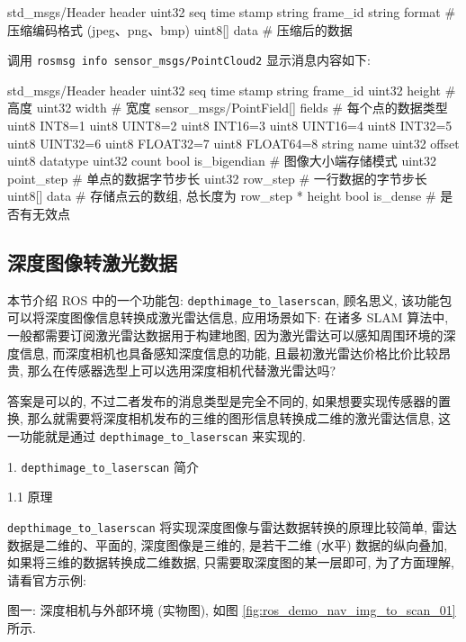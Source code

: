 \documentclass[openany, fontset=windowsold]{ctexbook}
\theoremstyle{kaiti}
\theoremstyle{normal}
\begin{document}
\begin{bash}
  std_msgs/Header header
    uint32 seq
    time stamp
    string frame_id
  string format # 压缩编码格式 (jpeg、png、bmp)
  uint8[] data # 压缩后的数据
\end{bash}

调用 \verb|rosmsg info sensor_msgs/PointCloud2| 显示消息内容如下:

\begin{bash}
  std_msgs/Header header
    uint32 seq
    time stamp
    string frame_id
  uint32 height # 高度
  uint32 width  # 宽度
  sensor_msgs/PointField[] fields # 每个点的数据类型
    uint8 INT8=1
    uint8 UINT8=2
    uint8 INT16=3
    uint8 UINT16=4
    uint8 INT32=5
    uint8 UINT32=6
    uint8 FLOAT32=7
    uint8 FLOAT64=8
    string name
    uint32 offset
    uint8 datatype
    uint32 count
  bool is_bigendian # 图像大小端存储模式
  uint32 point_step # 单点的数据字节步长
  uint32 row_step   # 一行数据的字节步长
  uint8[] data      # 存储点云的数组, 总长度为 row_step * height
  bool is_dense     # 是否有无效点
\end{bash}

\subsection{深度图像转激光数据}

本节介绍 ROS 中的一个功能包: \verb|depthimage_to_laserscan|, 顾名思义, 该功能包可以将深度图像信息转换成激光雷达信息, 应用场景如下: 在诸多 SLAM 算法中, 一般都需要订阅激光雷达数据用于构建地图, 因为激光雷达可以感知周围环境的深度信息, 而深度相机也具备感知深度信息的功能, 且最初激光雷达价格比价比较昂贵, 那么在传感器选型上可以选用深度相机代替激光雷达吗? 

答案是可以的, 不过二者发布的消息类型是完全不同的, 如果想要实现传感器的置换, 那么就需要将深度相机发布的三维的图形信息转换成二维的激光雷达信息, 这一功能就是通过 \verb|depthimage_to_laserscan| 来实现的.

1. \verb|depthimage_to_laserscan| 简介

1.1 原理

\verb|depthimage_to_laserscan| 将实现深度图像与雷达数据转换的原理比较简单, 雷达数据是二维的、平面的, 深度图像是三维的, 是若干二维 (水平) 数据的纵向叠加, 如果将三维的数据转换成二维数据, 只需要取深度图的某一层即可, 为了方面理解, 请看官方示例:

图一: 深度相机与外部环境 (实物图), 如图 \ref{fig:ros_demo_nav_img_to_scan_01} 所示.
\end{document}
